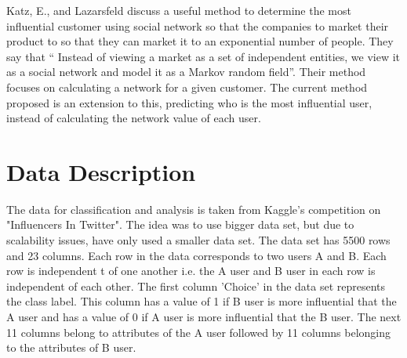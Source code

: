 \documentclass[sigconf]{acmart}
\begin{document}
Katz, E., and Lazarsfeld discuss a useful method to determine the most influential customer using social network so that the companies to market their product to so that they can market it to an exponential number of people. They say that “ Instead of viewing a market as a set of independent entities, we view it as a social network and model it as a Markov random field”.  Their method focuses on calculating a network for a given customer. The current method proposed is an extension to this, predicting who is the most influential user, instead of calculating the network value of each user.\cite{Katz1955}



\section{Data Description}
The data for classification and analysis is taken from Kaggle's competition on "Influencers In Twitter". The idea was to use bigger data set, but due to scalability issues, have only used a smaller data set. The data set has 5500 rows and 23 columns. Each row in the data corresponds to two users A and B. Each row is independent t of one another i.e. the A user and B user in each row is independent of each other. The first column 'Choice' in the data set represents the class label. This column has a value of 1 if B user is more influential that the A user and has a value of 0 if A user is more influential that the B user. The next 11 columns belong to attributes of the A user followed by 11 columns belonging to the attributes of B user.
\end{document}
